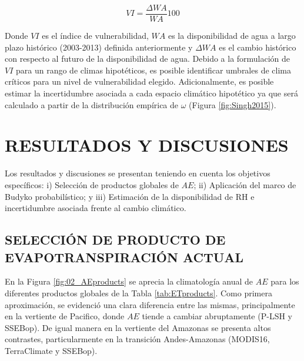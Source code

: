 \documentclass[12pt]{article}
\begin{document}
\begin{equation}
VI = \frac{\Delta WA}{WA}100
\end{equation}

Donde $VI$ es el índice de vulnerabilidad, $WA$ es la disponibilidad de agua a largo plazo histórico (2003-2013) definida anteriormente y $\Delta WA$ es el cambio histórico con respecto al futuro de la disponibilidad de agua. Debido a la formulación de $VI$ para un rango de climas hipotéticos, es posible identificar umbrales de clima críticos para un nivel de vulnerabilidad elegido. Adicionalmente, es posible estimar la incertidumbre asociada a cada espacio climático hipotético ya que será calculado a partir de la distribución empírica de $\omega$ (Figura \ref{fig:Singh2015}).

\clearpage
\vspace*{0.5mm}
\section{RESULTADOS Y DISCUSIONES}

\thispagestyle{empty}

Los resultados y discusiones se presentan teniendo en cuenta los objetivos específicos: i) Selección de productos globales de $AE$; ii) Aplicación del marco de Budyko probabilístico; y iii) Estimación de la disponibilidad de RH e incertidumbre asociada frente al cambio climático.

\subsection{SELECCIÓN DE PRODUCTO DE EVAPOTRANSPIRACIÓN ACTUAL}

En la Figura \ref{fig:02_AEproducts} se aprecia la climatología anual de $AE$ para los diferentes productos globales de la Tabla \ref{tab:ETproducts}. Como primera aproximación, se evidenció una clara diferencia entre las mismas, principalmente en la vertiente de Pacifico, donde $AE$ tiende a cambiar abruptamente (P-LSH y SSEBop). De igual manera en la vertiente del Amazonas se presenta altos contrastes, particularmente en la transición Andes-Amazonas (MODIS16, TerraClimate y SSEBop). 

\thispagestyle{empty}


\end{document}
